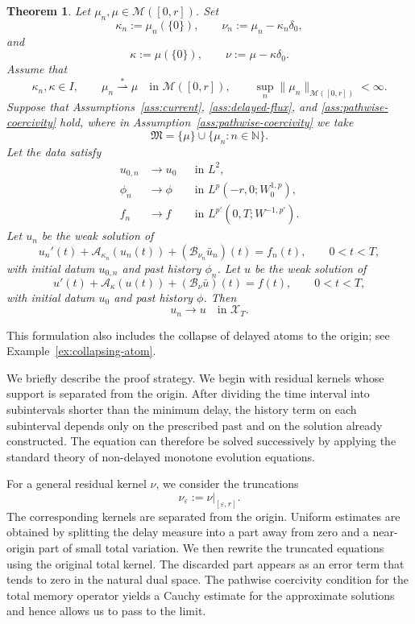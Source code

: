 \documentclass[a4paper,11pt,oneside,reqno]{amsart}
\newtheorem{theorem}{Theorem}[section]
\newcounter{c}
\newcounter{d}
\newcounter{b}
\newcommand{\M}{\mathcal{M}}
\newcommand{\KM}{\mathfrak{M}}
\begin{document}
\begin{theorem}
\label{thm:weakstar-stability}
Let $\mu_n,\mu\in\M([0,r])$. Set
\[
 \kappa_n:=\mu_n(\{0\}),\qquad
 \nu_n:=\mu_n-\kappa_n\delta_0,
\]
and
\[
 \kappa:=\mu(\{0\}),\qquad
 \nu:=\mu-\kappa\delta_0.
\]
Assume that
\[
 \kappa_n,\kappa\in I,
 \qquad
 \mu_n\stackrel{*}{\rightharpoonup}\mu
 \quad\text{in }\M([0,r]),
 \qquad
 \sup_n\|\mu_n\|_{\M([0,r])}<\infty .
\]
Suppose that Assumptions~\ref{ass:current}, \ref{ass:delayed-flux}, and
\ref{ass:pathwise-coercivity} hold, where in
Assumption~\ref{ass:pathwise-coercivity} we take
\[
 \KM=\{\mu\}\cup\{\mu_n:n\in\mathbb N\}.
\]
Let the data satisfy
\[
\begin{aligned}
 u_{0,n}&\to u_0
 &&\text{in }L^2,\\
 \phi_n&\to\phi
 &&\text{in }L^p(-r,0;W^{1,p}_0),\\
 f_n&\to f
 &&\text{in }L^{p'}(0,T;W^{-1,p'}).
\end{aligned}
\]
Let $u_n$ be the weak solution of
\begin{equation}
 u_n'(t)+\mathcal A_{\kappa_n}(u_n(t))
 +(\mathcal B_{\nu_n}\bar u_n)(t)=f_n(t),
 \qquad 0<t<T,
 \label{eq:weakstar-problem-n}
\end{equation}
with initial datum $u_{0,n}$ and past history $\phi_n$. Let $u$ be the weak
solution of
\begin{equation}
 u'(t)+\mathcal A_{\kappa}(u(t))
 +(\mathcal B_{\nu}\bar u)(t)=f(t),
 \qquad 0<t<T,
 \label{eq:weakstar-problem-limit}
\end{equation}
with initial datum $u_0$ and past history $\phi$. Then
\[
 u_n\to u
 \quad\text{in }\mathcal X_T.
\]
\end{theorem}




This formulation also includes the collapse of delayed atoms to the origin;
see Example~\ref{ex:collapsing-atom}.

We briefly describe the proof strategy. We begin with residual kernels whose
support is separated from the origin. After dividing the time interval into
subintervals shorter than the minimum delay, the history term on each
subinterval depends only on the prescribed past and on the solution already
constructed. The equation can therefore be solved successively by applying
the standard theory of non-delayed monotone evolution equations.

For a general residual kernel \(\nu\), we consider the truncations
\[
 \nu_\varepsilon:=\nu|_{[\varepsilon,r]}.
\]
The corresponding kernels are separated from the origin. Uniform estimates
are obtained by splitting the delay measure into a part away from zero and a
near-origin part of small total variation. We then rewrite the truncated
equations using the original total kernel. The discarded part appears as an
error term that tends to zero in the natural dual space. The pathwise
coercivity condition for the total memory operator yields a Cauchy estimate
for the approximate solutions and hence allows us to pass to the limit.
\end{document}
